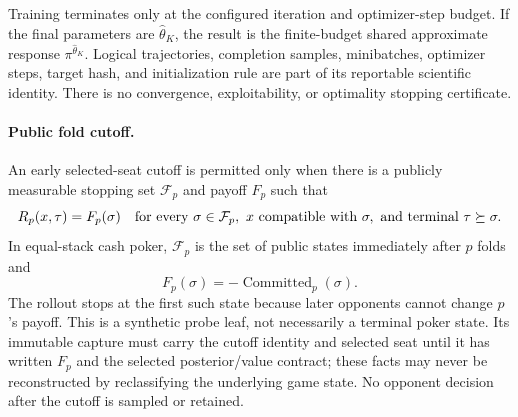 \documentclass[12pt, a4paper]{article}
\begin{document}
Training terminates only at the configured iteration and optimizer-step budget.
If the final parameters are $\widehat\theta_K$, the result is the finite-budget
shared approximate response $\pi^{\widehat\theta_K}$.  Logical trajectories,
completion samples, minibatches, optimizer steps, target hash, and initialization
rule are part of its reportable scientific identity.  There is no convergence,
exploitability, or optimality stopping certificate.

\paragraph{Public fold cutoff.}
An early selected-seat cutoff is permitted only when there is a publicly
measurable stopping set $\mathcal F_p$ and payoff $F_p$ such that
\begin{equation}\label{eq:probe-public-cutoff}
  R_p(x,\tau)=F_p(\sigma)
  \quad\textnormal{for every }\sigma\in\mathcal F_p,
  \ x\textnormal{ compatible with }\sigma,
  \textnormal{ and terminal }\tau\succeq\sigma.
\end{equation}
In equal-stack cash poker, $\mathcal F_p$ is the set of public states immediately
after $p$ folds and
\begin{equation}\label{eq:poker-probe-fold-payoff}
  F_p(\sigma)=-\operatorname{Committed}_p(\sigma).
\end{equation}
The rollout stops at the first such state because later opponents cannot change
$p$'s payoff.  This is a synthetic probe leaf, not necessarily a terminal poker
state.  Its immutable capture must carry the cutoff identity and selected seat
until it has written $F_p$ and the selected posterior/value contract; these
facts may never be reconstructed by reclassifying the underlying game state.
No opponent decision after the cutoff is sampled or retained.
\end{document}

